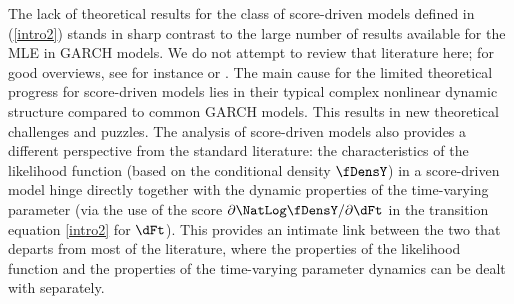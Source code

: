 The lack of theoretical results for the class of score-driven models defined in (\ref{intro2}) stands in sharp contrast to the large number of results available for the MLE in GARCH models. We do not attempt to review that literature here; for good overviews, see for instance \cite{straumann2005} or \cite{francqzakoian2010}.
The main cause for the limited theoretical progress for score-driven models lies in their typical complex nonlinear dynamic structure compared to common GARCH models.
This results in new theoretical challenges and puzzles.
The analysis of score-driven models also provides a different perspective from the standard literature: the characteristics of the likelihood function (based on the conditional density $\fDensY$) in a score-driven model hinge directly together with the dynamic properties of the time-varying parameter (via the use of the score $\partial \NatLog\fDensY/\partial\dFt$ in the transition equation \eqref{intro2} for $\dFt$). This provides an intimate link between the two that departs from most of the literature, where the properties of the likelihood function and the properties of the time-varying parameter dynamics can be dealt with separately.








